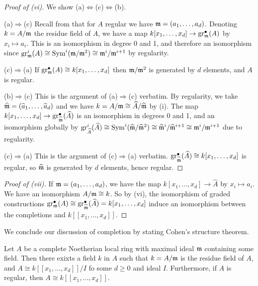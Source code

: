 \begin{proof}[Proof of (vi)]
    We show (a)$\Leftrightarrow$(c)$\Leftrightarrow$(b). 

    (a)$\Rightarrow$(c) Recall from  that for $A$ regular we have $\mathfrak{m}=(a_{1},\dots,a_{d})$. Denoting $k=A/\mathfrak{m}$ the residue field of $A$, we have a map $k[x_{1},\dots,x_{d}]\to\mathrm{gr}^{\bullet}_{\mathfrak{m}}(A)$ by $x_{i}\mapsto a_{i}$. This is an isomorphism in degree 0 and 1, and therefore an isomorphism since $\mathrm{gr}^{i}_{\mathfrak{m}}(A)\cong\mathrm{Sym}^{i}(\mathfrak{m}/\mathfrak{m}^{2})\cong\mathfrak{m}^{i}/\mathfrak{m}^{i+1}$ by regularity. 

    (c)$\Rightarrow$(a) If $\mathrm{gr}_{\mathfrak{m}}^{\bullet}(A)\cong k[x_{1},\dots,x_{d}]$ then $\mathfrak{m}/\mathfrak{m}^{2}$ is generated by $d$ elements, and $A$ is regular. 

    (b)$\Rightarrow$(c) This is the argument of (a)$\Rightarrow$(c) verbatim. By regularity, we take $\widehat{\mathfrak{m}}=(\widehat{a}_{1},\dots,\widehat{a}_{d})$ and we have $k=A/\mathfrak{m}\cong \widehat{A}/\widehat{\mathfrak{m}}$ by (i). The map $k[x_{1},\dots,x_{d}]\to\mathrm{gr}^{\bullet}_{\widehat{\mathfrak{m}}}(\widehat{A})$ is an isomorphism in degrees 0 and 1, and an isomorphism globally by $\mathrm{gr}^{i}_{\widehat{A}}(\widehat{A})\cong\mathrm{Sym}^{i}(\widehat{\mathfrak{m}}/\widehat{\mathfrak{m}}^{2})\cong\widehat{\mathfrak{m}}^{i}/\widehat{\mathfrak{m}}^{i+1}\cong\mathfrak{m}^{i}/\mathfrak{m}^{i+1}$ due to regularity. 

    (c)$\Rightarrow$(a) This is the argument of (c)$\Rightarrow$(a) verbatim. $\mathrm{gr}^{\bullet}_{\widehat{\mathfrak{m}}}(\widehat{A})\cong k[x_{1},\dots,x_{d}]$ is regular, so $\widehat{\mathfrak{m}}$ is generated by $d$ elements, hence regular. 
\end{proof}
\begin{proof}[Proof of (vii)]
    If $\mathfrak{m}=(a_{1},\dots,a_{d})$, we have the map $k[x_{1},\dots,x_{d}]\to\widehat{A}$ by $x_{i}\mapsto a_{i}$. We have an isomorphism $A/\mathfrak{m}\cong k$. So by (vi), the isomorphism of graded constructions $\mathrm{gr}_{\mathfrak{m}}^{\bullet}(A)\cong\mathrm{gr}_{\widehat{\mathfrak{m}}}^{\bullet}(\widehat{A})=k[x_{1},\dots,x_{d}]$ induce an isomorphism between the completions and $k[[x_{1},\dots,x_{d}]]$. 
\end{proof}
We conclude our discussion of completion by stating Cohen's structure theorem. 
\begin{theorem}\label{thm: Cohen structure}
    Let $A$ be a complete Noetherian local ring with maximal ideal $\mathfrak{m}$ containing some field. Then there exixts a field $k$ in $A$ such that $k=A/\mathfrak{m}$ is the residue field of $A$, and $A\cong k[[x_{1},\dots,x_{d}]]/I$ fo some $d\geq0$ and ideal $I$. Furthermore, if $A$ is regular, then $A\cong k[[x_{1},\dots,x_{d}]]$. 
\end{theorem}
